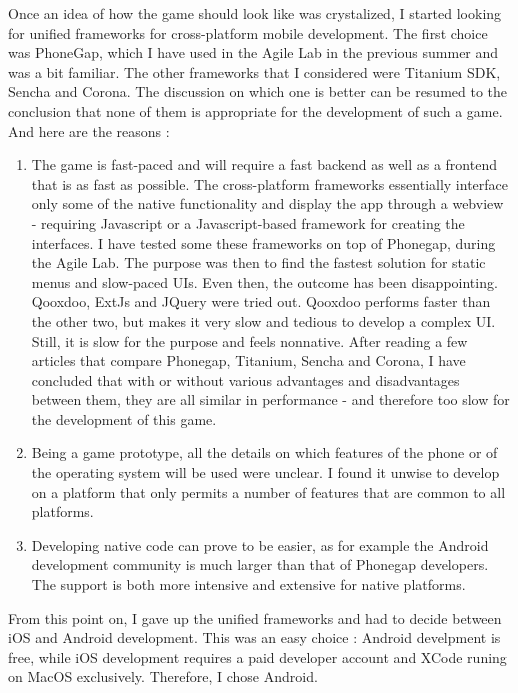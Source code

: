 \documentclass{article}
\begin{document}
Once an idea of how the game should look like was crystalized, I started looking
for unified frameworks for cross-platform mobile development. The first choice
was PhoneGap, which I have used in the Agile Lab in the previous summer and was
a bit familiar. The other frameworks that I considered were Titanium SDK, Sencha
and Corona. The discussion on which one is better can be resumed to the
conclusion that none of them is appropriate for the development of such a game.
And here are the reasons : 
\begin{enumerate}
  \item The game is fast-paced and will require a fast backend as well as a
  frontend that is as fast as possible. The cross-platform frameworks
  essentially interface only some of the native functionality and display the
  app through a webview - requiring Javascript or a Javascript-based framework
  for creating the interfaces. I have tested some these frameworks on top of
  Phonegap, during the Agile Lab. The purpose was then to find the fastest
  solution for static menus and slow-paced UIs. Even then, the outcome has been
  disappointing. Qooxdoo, ExtJs and JQuery were tried out. Qooxdoo
  performs faster than the other two, but makes it very slow and tedious to
  develop a complex UI. Still, it is slow for the purpose and feels nonnative. 
  After reading a few articles that compare Phonegap, Titanium, Sencha and
  Corona, I have concluded that with or without various advantages and
  disadvantages between them, they are all similar in performance - and
  therefore too slow for the development of this game.
  
  \item Being a game prototype, all the details on which features of the phone
  or of the operating system will be used were unclear. I found it unwise to
  develop on a platform that only permits a number of features that are common
  to all platforms.
  
  \item Developing native code can prove to be easier, as for example the
  Android development community is much larger than that of Phonegap developers.
  The support is both more intensive and extensive for native platforms.
  
\end{enumerate}

From this point on, I gave up the unified frameworks and had to decide between
iOS and Android development. This was an easy choice : Android develpment is
free, while iOS development requires a paid developer account and XCode runing
on MacOS exclusively. Therefore, I chose Android. 
\end{document}
